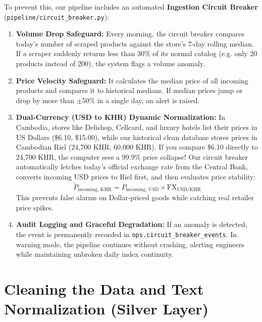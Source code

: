 \documentclass[11pt,a4paper,oneside]{article}
\begin{document}
To prevent this, our pipeline includes an automated \textbf{Ingestion Circuit Breaker} (\texttt{pipeline/circuit\_breaker.py}):
\begin{enumerate}
    \item \textbf{Volume Drop Safeguard:} Every morning, the circuit breaker compares today's number of scraped products against the store's 7-day rolling median. If a scraper suddenly returns less than 30\% of its normal catalog (e.g. only 20 products instead of 200), the system flags a volume anomaly.
    \item \textbf{Price Velocity Safeguard:} It calculates the median price of all incoming products and compares it to historical medians. If median prices jump or drop by more than $\pm 50\%$ in a single day, an alert is raised.
    \item \textbf{Dual-Currency (USD to KHR) Dynamic Normalization:} In Cambodia, stores like Delishop, Cellcard, and luxury hotels list their prices in US Dollars (\$6.10, \$15.00), while our historical clean database stores prices in Cambodian Riel (24,700 KHR, 60,000 KHR). If you compare \$6.10 directly to 24,700 KHR, the computer sees a 99.9\% price collapse! Our circuit breaker automatically fetches today's official exchange rate from the Central Bank, converts incoming USD prices to Riel first, and then evaluates price stability:
    $$\tilde{P}_{\text{incoming, KHR}} = P_{\text{incoming, USD}} \times \text{FX}_{\text{USD/KHR}}$$
    This prevents false alarms on Dollar-priced goods while catching real retailer price spikes.
    \item \textbf{Audit Logging and Graceful Degradation:} If an anomaly is detected, the event is permanently recorded in \texttt{ops.circuit\_breaker\_events}. In warning mode, the pipeline continues without crashing, alerting engineers while maintaining unbroken daily index continuity.
\end{enumerate}

\newpage

\section{Cleaning the Data and Text Normalization (Silver Layer)}
\end{document}

